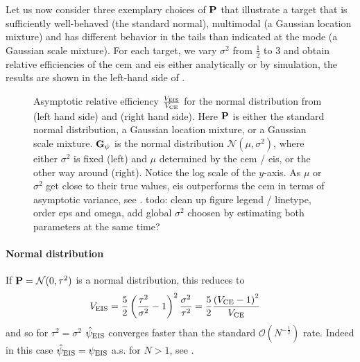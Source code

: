 \begin{example}
    Let us now consider three exemplary choices of $\P$ that illustrate a target that is sufficiently well-behaved (the standard normal), multimodal (a Gaussian location mixture) and has different behavior in the tails than indicated at the mode (a Gaussian scale mixture). 
    For each target, we vary $\sigma^{2}$ from $\frac{1}{2}$ to $3$ and obtain relative efficiencies of the \gls{cem} and \gls{eis} either analytically or by simulation, the results are shown in the left-hand side of .

    \begin{figure}
        \centering

        \resizebox{\textwidth}{!}{%
        }
        \caption{Asymptotic relative efficiency $\frac{V_{\eis}}{V_{\ce}}$ for the normal distribution from  (left hand side) and  (right hand side). Here $\P$ is either the standard normal distribution, a Gaussian location mixture, or a Gaussian scale mixture. $\G_{\psi}$ is the normal distribution $\mathcal N(\mu, \sigma^{2})$, where either $\sigma^{2}$ is fixed (left) and $\mu$ determined by the \gls{cem} / \gls{eis}, or the other way around (right). Notice the log scale of the $y$-axis. As $\mu$ or $\sigma^{2}$ get close to their true values, \gls{eis} outperforms the \gls{cem} in terms of asymptotic variance, see . {\color{red} todo: clean up figure legend / linetype, order eps and omega, add global $\sigma^{2}$ choosen by estimating both parameters at the same time?}}
        \label{fig:are}
    \end{figure}

    
    \paragraph{Normal distribution}
    If $\P = \mathcal N(0, \tau^{2})$ is a normal distribution, this reduces to
    \begin{align*}
        V_{\eis} &= \frac{5}{2} \left( \frac{\tau^{2}}{\sigma^{2}} - 1 \right)^{2} \frac{\sigma^{2}}{\tau^{2}} = \frac{5}{2} \frac{\left( V_{\ce} - 1\right)^{2}}{V_{\ce}}
    \end{align*}
    and so for $\tau^{2} = \sigma^{2}$ $\hpeis$ converges faster than the standard $\mathcal O( N^{-\frac{1}{2}})$ rate. Indeed in this case $\hpeis = \peis$ a.s. for $N > 1$, see .

    

\end{example}
